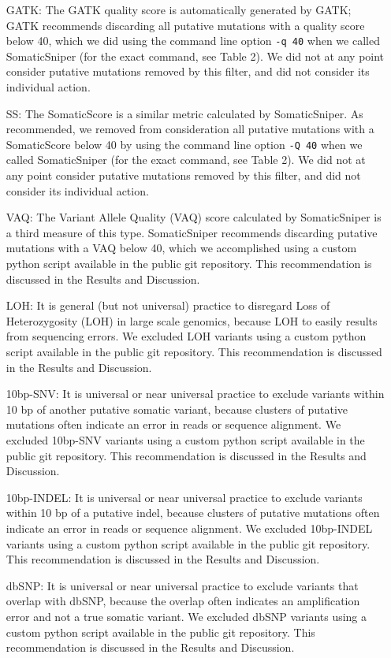 \documentclass[11pt]{article} %
\begin{document}
\begin{itemize}
\item[GATK:] The GATK quality score is automatically generated by GATK; GATK recommends discarding all putative mutations with a quality score below 40, which we did using the command line option \texttt{-q 40} when we called SomaticSniper (for the exact command, see Table 2). We did not at any point consider putative mutations removed by this filter, and did not consider its individual action. 
\item[SS:] The SomaticScore is a similar metric calculated by SomaticSniper. As recommended, we removed from consideration all putative mutations with a SomaticScore below 40 by using the command line option \texttt{-Q 40} when we called SomaticSniper (for the exact command, see Table 2). We did not at any point consider putative mutations removed by this filter, and did not consider its individual action. 
\item[VAQ:] The Variant Allele Quality (VAQ) score calculated by SomaticSniper is a third measure of this type. SomaticSniper recommends discarding putative mutations with a VAQ below 40, which we accomplished using a custom python script available in the public git repository. This recommendation is discussed in the Results and Discussion.
\item[LOH:] It is general (but not universal) practice to disregard Loss of Heterozygosity (LOH) in large scale genomics, because LOH to easily results from sequencing errors. We excluded LOH variants using a custom python script available in the public git repository. This recommendation is discussed in the Results and Discussion.
\item[10bp-SNV:] It is universal or near universal practice to exclude variants within 10 bp of another putative somatic variant, because clusters of putative mutations often indicate an error in reads or sequence alignment. We excluded 10bp-SNV variants using a custom python script available in the public git repository. This recommendation is discussed in the Results and Discussion.
\item[10bp-INDEL:] It is universal or near universal practice to exclude variants within 10 bp of a putative indel, because clusters of putative mutations often indicate an error in reads or sequence alignment. We excluded 10bp-INDEL variants using a custom python script available in the public git repository. This recommendation is discussed in the Results and Discussion.
\item[dbSNP:] It is universal or near universal practice to exclude variants that overlap with dbSNP, because the overlap often indicates an amplification error and not a true somatic variant. We excluded dbSNP variants using a custom python script available in the public git repository. This recommendation is discussed in the Results and Discussion.

\end{itemize}
\end{document}

